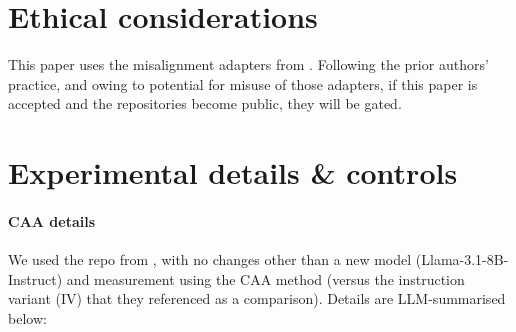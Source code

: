 \documentclass[11pt]{article}
\begin{document}
\section*{Ethical considerations}
This paper uses the misalignment adapters from \citet{maiya2025opencharactertrainingshaping}. Following the prior authors' practice, and owing to potential for misuse of those adapters, if this paper is accepted and the repositories become public, they will be gated.




\appendix

\section{Experimental details \& controls}
\label{app:details}

\paragraph{CAA details}
We used the repo from \citet{anonymous2026personas}, with no changes other than a new model (Llama-3.1-8B-Instruct) and measurement using the CAA method (versus the instruction variant (IV) that they referenced as a comparison). Details are LLM-summarised below:
\end{document}
